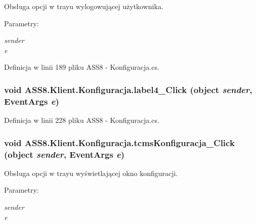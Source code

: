 Obsługa opcji w trayu wylogowującej użytkownika. 

\begin{Desc}
\item[Parametry:]
\begin{description}
\item[{\em sender}]\item[{\em e}]\end{description}
\end{Desc}


Definicja w linii 189 pliku ASS8 - Konfiguracja.cs.\hypertarget{a00014_c585e179ba2eae275bc72800350139ed}{
\subsubsection[{label4\_\-Click}]{\setlength{\rightskip}{0pt plus 5cm}void ASS8.Klient.Konfiguracja.label4\_\-Click (object {\em sender}, \/  EventArgs {\em e})}}
\label{d2/de7/a00014_c585e179ba2eae275bc72800350139ed}




Definicja w linii 228 pliku ASS8 - Konfiguracja.cs.\hypertarget{a00014_321774e21dbe196e41840825cbe7c915}{
\subsubsection[{tcmsKonfiguracja\_\-Click}]{\setlength{\rightskip}{0pt plus 5cm}void ASS8.Klient.Konfiguracja.tcmsKonfiguracja\_\-Click (object {\em sender}, \/  EventArgs {\em e})}}
\label{d2/de7/a00014_321774e21dbe196e41840825cbe7c915}


Obsługa opcji w trayu wyświetlającej okno konfiguracji. 

\begin{Desc}
\item[Parametry:]
\begin{description}
\item[{\em sender}]\item[{\em e}]\end{description}
\end{Desc}


